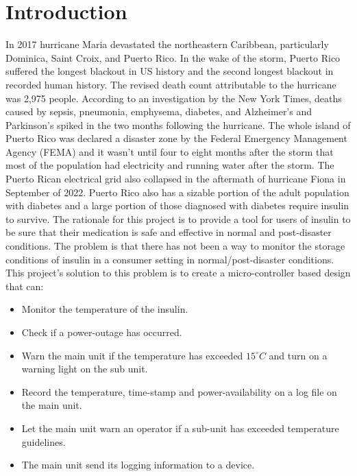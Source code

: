 \section{Introduction}
In 2017 hurricane Maria devastated the northeastern Caribbean, particularly Dominica, Saint Croix, and Puerto Rico. In the wake of the storm, Puerto Rico suffered the longest blackout in US history and the second longest blackout in recorded human history\cite{WorldSecondLargest}. The revised death count attributable to the hurricane was 2,975 people\cite{HurricaneMariaCaused2018}. According to an investigation by the New York Times, deaths caused by  sepsis, pneumonia, emphysema, diabetes, and Alzheimer's and Parkinson's spiked in the two months following the hurricane\cite{roblesOfficialTollPuerto2017}. The whole island of Puerto Rico was declared a disaster zone by the Federal Emergency Management Agency (FEMA) and it wasn't until four to eight months after the storm that most of the population had electricity and running water after the storm. The Puerto Rican electrical grid also collapsed in the aftermath of hurricane Fiona in September of 2022. Puerto Rico also has a sizable portion of the adult population with diabetes and a large portion of those diagnosed with diabetes require insulin to survive\cite{DiabetesPrevalencePopulation}. The rationale for this project is to provide a tool for users of insulin to be sure that their medication is safe and effective in normal and post-disaster conditions. The problem is that there has not been a way to monitor the storage conditions of insulin in a consumer setting in normal/post-disaster conditions. This project's solution to this problem is to create a micro-controller based design that can:
\begin{itemize}
  \item Monitor the temperature of the insulin.
  \item Check if a power-outage has occurred.
  \item Warn the main unit if the temperature has exceeded \textnormal{$15^{\circ}C$} and turn on a warning light on the sub unit.
  \item Record the temperature, time-stamp and power-availability on a log file on the main unit.
  \item Let the main unit warn an operator if a sub-unit has exceeded temperature guidelines.
  \item The main unit send its logging information to a device.
\end{itemize}
